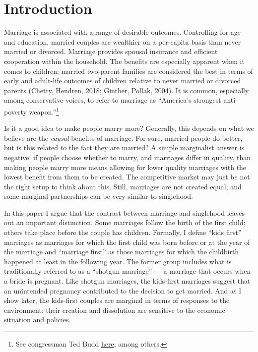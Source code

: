 \documentclass[12pt,letter]{article}
\begin{document}
\section{Introduction}
Marriage is associated with a range of desirable outcomes. Controlling for age and education, married couples are wealthier on a per-capita basis than never married or divorced. Marriage provides spousal insurance and efficient cooperation within the household. The benefits are especially apparent when it comes to children: married two-parent families are considered the best in terms of early and adult-life outcomes of children relative to never married or divorced parents (Chetty, Hendren, 2018\nocite{chetty2018impacts}; Ginther, Pollak, 2004\nocite{ginther2004family}). It is common, especially among conservative voices, to refer to marriage as ``America's strongest anti-poverty weapon.''\footnote{See congressman Ted Budd \href{https://www.dailysignal.com/2020/02/24/marriage-is-the-ticket-out-of-poverty/}{here}, among others.} 

Is it a good idea to make people marry more? Generally, this depends on what we believe are the \emph{causal} benefits of marriage. For sure, married people do better, but is this related to the fact they are married? A simple marginalist answer is negative: if people choose whether to marry, and marriages differ in quality, than making people marry more means allowing for lower quality marriages with the lowest benefit from them to be created. The competitive market may just be not the right setup to think about this. Still, marriages are not created equal, and some marginal partnerships can be very similar to singlehood. 

In this paper I argue that the contrast between marriage and singlehood leaves out an important distinction. Some marriages follow the birth of the first child; others take place before the couple has children. Formally, I define ``kids first'' marriages as marriages for which the first child was born before or at the year of the marriage and ``marriage first'' as those marriages for which the childbirth happened at least in the following year. The former group includes what is traditionally referred to as a ``shotgun marriage'' --- a marriage that occurs when a bride is pregnant. Like shotgun marriages, the kids-first marriages suggest that an unintended pregnancy contributed to the decision to get married. And as I show later, the kids-first couples are marginal in terms of responses to the environment: their creation and dissolution are sensitive to the economic situation and policies.
\end{document}
